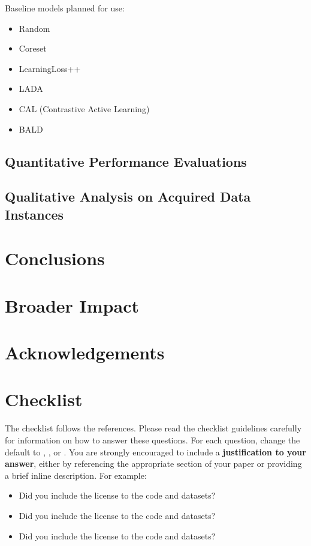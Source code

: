 \documentclass{article}
\begin{document}
Baseline models planned for use:

\begin{itemize}
    \item Random
    \item Coreset
    \item LearningLoss++
    \item LADA
    \item CAL (Contrastive Active Learning)
    \item BALD
\end{itemize}

\subsection{Quantitative Performance Evaluations}


\subsection{Qualitative Analysis on Acquired Data Instances}

\section{Conclusions}

\section{Broader Impact}

\section{Acknowledgements}




\section*{Checklist}

The checklist follows the references. Please read the checklist guidelines
carefully for information on how to answer these questions. For each
question, change the default \answerTODO{} to \answerYes{}, \answerNo{}, or
\answerNA{}. You are strongly encouraged to include a {\bf justification to
your answer}, either by referencing the appropriate section of your paper or
providing a brief inline description. For example:
\begin{itemize}
  \item Did you include the license to the code and datasets? 
  \item Did you include the license to the code and datasets? 
  \item Did you include the license to the code and datasets? \answerNA{}
\end{itemize}
\end{document}
